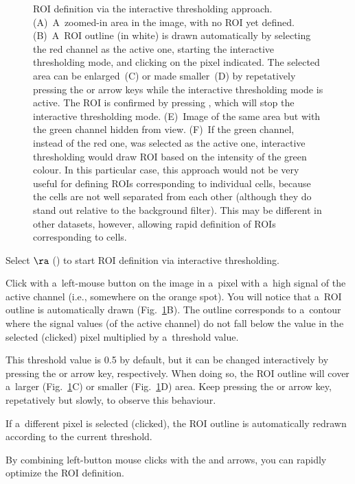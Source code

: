 \begin{figure}[!ht]
\begin{tabular}{cccccc}
\end{tabular}
\caption{\label{fig:roi-interactive5}%
ROI definition via the interactive thresholding approach. (A)~A~zoomed-in area in the image, with no ROI yet defined. (B)~A~ROI outline (in white) is drawn automatically by selecting the red channel as the active one, starting the interactive thresholding mode, and clicking on the pixel indicated. The selected area can be enlarged~(C) or made smaller~(D) by repetatively pressing the  or  arrow keys while the interactive thresholding mode is active. The ROI is confirmed by pressing , which will stop the interactive thresholding mode. (E)~Image of the same area but with the green channel hidden from view. (F)~If the green channel, instead of the red one, was selected as the active one, interactive thresholding would draw ROI based on the intensity of the green colour. In this particular case, this approach would not be very useful for defining ROIs corresponding to individual cells, because the cells are not well separated from each other (although they do stand out relative to the background filter). This may be different in other datasets, however, allowing rapid definition of ROIs corresponding to cells.}
\end{figure}

\s Select  $\ra$  () to start ROI definition via interactive thresholding.

\bul Click with a~left-mouse button on the image in a~pixel with a~high signal of the active channel (i.e., somewhere on the orange spot). You will notice that a~ROI outline is automatically drawn (Fig.~\ref{fig:roi-interactive5}B). The outline corresponds to a~contour where the signal values (of the active channel) do not fall below the value in the selected (clicked) pixel multiplied by a~threshold value.

\bul This threshold value is 0.5 by default, but it can be changed interactively by pressing the  or  arrow key, respectively. When doing so, the ROI outline will cover a~larger (Fig.~\ref{fig:roi-interactive5}C) or smaller (Fig.~\ref{fig:roi-interactive5}D) area. Keep pressing the  or  arrow key, repetatively but slowly, to observe this behaviour. 

\bul If a~different pixel is selected (clicked), the ROI outline is automatically redrawn according to the current threshold.

\bul By combining left-button mouse clicks with the  and  arrows, you can rapidly optimize the ROI definition.

